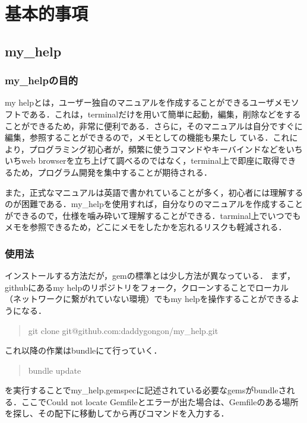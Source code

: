 \chapter{基本的事項}\label{ux57faux672cux7684ux4e8bux9805}

\section{my\_help}\label{my_help}

\subsection{my\_helpの目的}\label{my_helpux306eux76eeux7684}

my
helpとは，ユーザー独自のマニュアルを作成することができるユーザメモソフトである．これは，terminalだけを用いて簡単に起動，編集，削除などをすることができるため，非常に便利である．さらに，そのマニュアルは自分ですぐに編集，参照することができるので，メモとしての機能も果たし
ている．これにより，プログラミング初心者が，頻繁に使うコマンドやキーバインドなどをいちいちweb
browserを立ち上げて調べるのではなく，terminal上で即座に取得できるため，プログラム開発を集中することが期待される．

また，正式なマニュアルは英語で書かれていることが多く，初心者には理解するのが困難である．my\_helpを使用すれば，自分なりのマニュアルを作成することができるので，仕様を噛み砕いて理解することができる．tarminal上でいつでもメモを参照できるため，どこにメモをしたかを忘れるリスクも軽減される．

\subsection{使用法}\label{ux4f7fux7528ux6cd5}

インストールする方法だが，gemの標準とは少し方法が異なっている．
まず，githubにあるmy
helpのリポジトリをフォーク，クローンすることでローカル（ネットワークに繋がれていない環境）でもmy
helpを操作することができるようになる．

\begin{quote}
git clone git@github.com:daddygongon/my\_help.git
\end{quote}
これ以降の作業はbundleにて行っていく．

\begin{quote}
bundle update
\end{quote}
を実行することでmy\_help.gemspecに記述されている必要なgemsがbundleされる．ここでCould
not locate
Gemfileとエラーが出た場合は、Gemfileのある場所を探し、その配下に移動してから再びコマンドを入力する．

